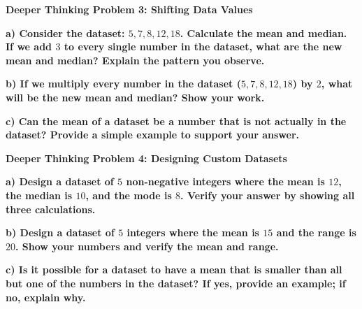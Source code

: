 \documentclass[12pt, letterpaper, fleqn]{article}
\begin{document}
\begin{tcolorbox}[colback=black!5, colframe=black!50, boxrule=1pt, arc=4mm, left=6mm, right=6mm, top=5mm, bottom=5mm]
\textbf{Deeper Thinking Problem 3: Shifting Data Values}

\medskip

\noindent
\textbf{a) Consider the dataset: $5, 7, 8, 12, 18$. Calculate the mean and median. If we add $3$ to every single number in the dataset, what are the new mean and median? Explain the pattern you observe.}

\vspace{3cm}

\noindent
\textbf{b) If we multiply every number in the dataset ($5, 7, 8, 12, 18$) by $2$, what will be the new mean and median? Show your work.}

\vspace{3cm}

\noindent
\textbf{c) Can the mean of a dataset be a number that is not actually in the dataset? Provide a simple example to support your answer.}

\vspace{2.5cm}
\end{tcolorbox}
\newpage

\begin{tcolorbox}[colback=black!5, colframe=black!50, boxrule=1pt, arc=4mm, left=6mm, right=6mm, top=5mm, bottom=5mm]
\textbf{Deeper Thinking Problem 4: Designing Custom Datasets}

\medskip

\noindent
\textbf{a) Design a dataset of $5$ non-negative integers where the mean is $12$, the median is $10$, and the mode is $8$. Verify your answer by showing all three calculations.}

\vspace{3cm}

\noindent
\textbf{b) Design a dataset of $5$ integers where the mean is $15$ and the range is $20$. Show your numbers and verify the mean and range.}

\vspace{3cm}

\noindent
\textbf{c) Is it possible for a dataset to have a mean that is smaller than all but one of the numbers in the dataset? If yes, provide an example; if no, explain why.}

\vspace{2.5cm}
\end{tcolorbox}
\end{document}
